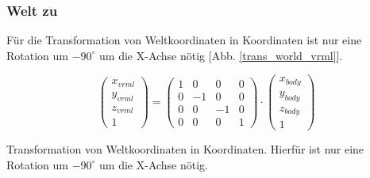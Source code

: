 \subsubsection{Welt zu \vrml}
Für die Transformation von Weltkoordinaten in \vrml Koordinaten ist nur eine Rotation um $-90^\circ$ um die X-Achse nötig [Abb. \ref{trans_world_vrml}].
\begin{ownequation}[H]
\begin{equation}
\begin{pmatrix}
x_{vrml}\\y_{vrml}\\z_{vrml}\\1
\end{pmatrix}
=
\begin{pmatrix}
1 & 0 & 0& 0\\
0 & -1 & 0& 0\\
0 & 0 & -1& 0\\
0 & 0 & 0 & 1
\end{pmatrix}
\cdot
\begin{pmatrix}
x_{body}\\y_{body}\\z_{body}\\1
\end{pmatrix}
\end{equation}
\caption[Transformation von Weltkoordinaten in \vrml Koordinaten]{Transformation von Weltkoordinaten in \vrml Koordinaten. Hierfür ist nur eine Rotation um $-90^\circ$ um die X-Achse nötig.}
\label{trans_world_vrml}
\end{ownequation}